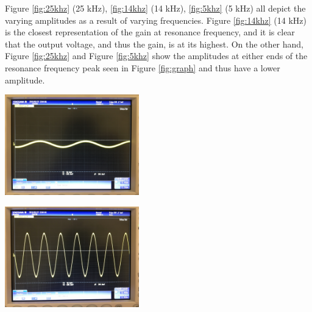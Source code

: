 \documentclass[journal]{IEEEtran}
\begin{document}
\noindent Figure \ref{fig:25khz} (25 kHz), \ref{fig:14khz} (14 kHz), \ref{fig:5khz} (5 kHz) all depict the varying amplitudes as a result of varying frequencies. Figure \ref{fig:14khz} (14 kHz) is the closest representation of the gain at resonance frequency, and it is clear that the output voltage, and thus the gain, is at its highest. On the other hand, Figure \ref{fig:25khz} and Figure \ref{fig:5khz} show the amplitudes at either ends of the resonance frequency peak seen in Figure \ref{fig:graph} and thus have a lower amplitude.

\begingroup
    \centering
    \medskip
    \includegraphics[width=220]{images/lab5_5.jpg}
    \label{fig:25khz}
    \medskip
\endgroup

\begingroup
    \centering
    \includegraphics[width=220]{images/lab5_4.jpg}
    \label{fig:14khz}
\endgroup
\end{document}
